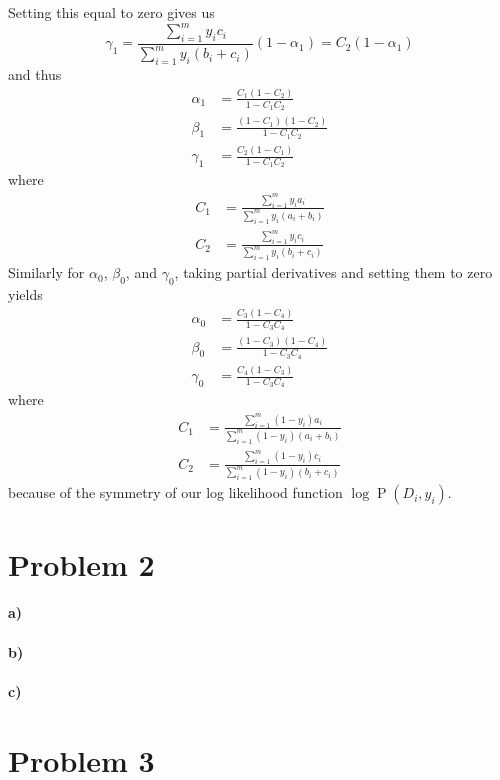 \documentclass[12pt]{article}
\begin{document}
Setting this equal to zero gives us
\[\gamma_1=\frac{\sum_{i=1}^m y_ic_i}{\sum_{i=1}^m y_i(b_i+c_i)}(1-\alpha_1)=C_2(1-\alpha_1)\]
and thus
\begin{align*}
        \alpha_1&=\frac{C_1(1-C_2)}{1-C_1C_2}\\
        \beta_1&=\frac{(1-C_1)(1-C_2)}{1-C_1C_2}\\
        \gamma_1&=\frac{C_2(1-C_1)}{1-C_1C_2}
\end{align*}
where
\begin{align*}
        C_1&=\frac{\sum_{i=1}^m y_ia_i}{\sum_{i=1}^m y_i(a_i+b_i)}\\
        C_2&=\frac{\sum_{i=1}^m y_ic_i}{\sum_{i=1}^m y_i(b_i+c_i)}
\end{align*}
Similarly for \(\alpha_0\), \(\beta_0\), and \(\gamma_0\), taking partial derivatives and setting them to zero yields
\begin{align*}
        \alpha_0&=\frac{C_3(1-C_4)}{1-C_3C_4}\\
        \beta_0&=\frac{(1-C_3)(1-C_4)}{1-C_3C_4}\\
        \gamma_0&=\frac{C_4(1-C_3)}{1-C_3C_4}
\end{align*}
where
\begin{align*}
        C_1&=\frac{\sum_{i=1}^m (1-y_i)a_i}{\sum_{i=1}^m (1-y_i)(a_i+b_i)}\\
        C_2&=\frac{\sum_{i=1}^m (1-y_i)c_i}{\sum_{i=1}^m (1-y_i)(b_i+c_i)}
\end{align*}
because of the symmetry of our log likelihood function \(\log \operatorname{P}(D_i, y_i)\).

\section*{Problem 2}

\paragraph{a)}

\paragraph{b)}

\paragraph{c)}

\section*{Problem 3}
\end{document}
